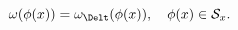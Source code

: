 \begin{equation} \label{compare}
\omega (\phi (x)) = \omega_{\Delt} (\phi (x)), \quad \phi (x) 
\in {\cal S}_x.
\end{equation}

